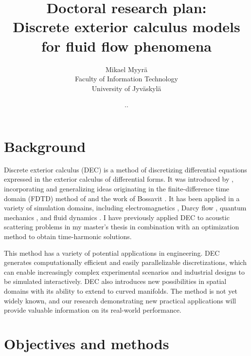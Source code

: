 \documentclass{article}
\title{Doctoral research plan: \\
Discrete exterior calculus models for fluid flow phenomena}
\author{Mikael Myyrä \\
Faculty of Information Technology \\
University of Jyväskylä}
\date{\number\day.\number\month.\number\year}
\begin{document}
\maketitle

\section*{Background}

Discrete exterior calculus (DEC) is a method of discretizing
differential equations expressed in the exterior calculus of differential forms.
It was introduced by \textcite{desbrun_discrete_2005},
incorporating and generalizing ideas originating
in the finite-difference time domain (FDTD)
method of \textcite{yee_numerical_1966} and the work of Bossavit
\parencite*{bossavit_geometry_1998,bossavit_computational_1999,
bossavit_computational_2000,bossavit_generalized_2001,bossavit_discretization_2005}.
It has been applied in a variety of simulation domains,
including electromagnetics \parencite{rabina_efficient_2015,monkola_discrete_2022},
Darcy flow \parencite{hirani_numerical_2015},
quantum mechanics \parencite{rabina_three-dimensional_2018,kivioja_evolution_2023},
and fluid dynamics \parencite{mohamed_discrete_2016,nitschke_discrete_2017}.
I have previously applied DEC to acoustic scattering problems
in my master's thesis \parencite{myyra_discrete_2023} 
in combination with an optimization method to obtain time-harmonic solutions.

This method has a variety of potential applications in engineering.
DEC generates computationally efficient and easily parallelizable discretizations,
which can enable increasingly complex experimental scenarios
and industrial designs to be simulated interactively.
DEC also introduces new possibilities in spatial domains
with its ability to extend to curved manifolds.
The method is not yet widely known,
and our research demonstrating new practical applications
will provide valuable information on its real-world performance.

\section*{Objectives and methods}
\end{document}
